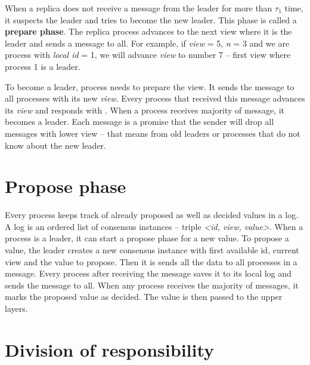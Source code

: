 \begin{TODO} %
When a replica does not receive a message from the leader for more than $\tau_1$ time, it suspects the leader and tries to become the new leader. This phase is called a \textbf{prepare phase}. The replica process advances to the next view where it is the leader and sends a \prepare message to all. For example, if \textit{view} = 5, \textit{n} = 3 and we are process with \textit{local id} = 1, we will advance \textit{view} to number 7 -- first view where process 1 is a leader.

To become a leader, process needs to prepare the view. It sends the \prepare message to all processes with its new \textit{view}. Every process that received this message advances its \textit{view} and responds with \prepareOK[]. When a process receives majority of \prepareOK message, it becomes a leader. Each \prepareOK message is a promise that the sender will drop all messages with lower view -- that means from old leaders or processes that do not know about the new leader.
\end{TODO}


\section{Propose phase} 

Every process keeps track of already proposed as well as decided values in a log. A log is an ordered list of consensus instances -- triple \textit{<id, view, value>}. When a process is a leader, it can start a propose phase for a new value. To propose a value, the leader creates a new consensus instance with first available id, current view and the value to propose. Then it is sends all the data to all processes in a \propose message. Every process after receiving the \propose message saves it to its local log and sends the \accept message to all. When any process receives the majority of \accept messages, it marks the proposed value as decided. The value is then passed to the upper layers.


\section{Division of responsibility}

